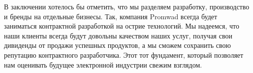 \documentclass[10pt, a5paper]{article}
\begin{document}


В заключении хотелось бы отметить, что мы разделяем разработку, производство и бренды на отдельные бизнесы. Так, компания Promwad всегда будет заниматься контрактной разработкой на острие технологий. Мы надеемся, что наши клиенты всегда будут довольны качеством наших услуг, получая свои дивиденды от продажи успешных продуктов, а мы сможем сохранить свою репутацию контрактного разработчика. Этот тот фундамент, который позволяет нам оценивать будущее электронной индустрии свежим взглядом.
\end{document}
